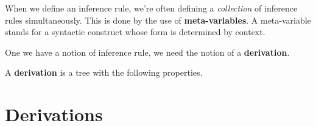 \begin{example}

\end{example}

When we define an inference rule, we're often defining a \textit{collection} of inference rules simultaneously.
This is done by the use of \textbf{meta-variables}.
A meta-variable stands for a syntactic construct whose form is determined by context.

One we have a notion of inference rule, we need the notion of a \textbf{derivation}.

\begin{definition}
A \textbf{derivation} is a tree with the following properties.
\end{definition}

\section{Derivations}
